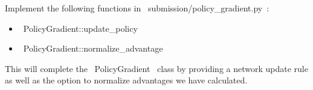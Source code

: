 \item {}

Implement the following functions in ~submission/policy_gradient.py~: 

\begin{itemize}
	\item ~PolicyGradient::update_policy~ 
	\item ~PolicyGradient::normalize_advantage~ 
\end{itemize}

This will complete the ~PolicyGradient~ class by providing a network update rule as well as the option to normalize advantages we have calculated.